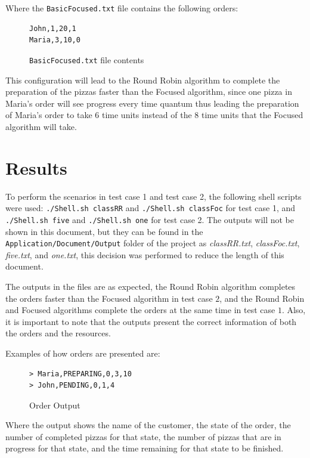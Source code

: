 \documentclass[conference]{IEEEtran}
\begin{document}
Where the \texttt{BasicFocused.txt} file contains the following orders:
\begin{figure}[H]
    \centering
    \begin{lstlisting}[style=input, frame=single]
John,1,20,1
Maria,3,10,0
    \end{lstlisting}
    \caption{\centering \texttt{BasicFocused.txt} file contents}
    \label{fig:orders1}
\end{figure}

This configuration will lead to the Round Robin algorithm to complete the preparation of the pizzas faster than the Focused algorithm, since one pizza in Maria's order will see progress every time quantum thus leading the preparation of Maria's order to take $6$ time units instead of the $8$ time units that the Focused algorithm will take.
\section{Results}
To perform the scenarios in test case 1 and test case 2, the following shell scripts were used: \texttt{./Shell.sh classRR} and \texttt{./Shell.sh classFoc} for test case 1, and \texttt{./Shell.sh five} and \texttt{./Shell.sh one} for test case 2. The outputs will not be shown in this document, but they can be found in the \texttt{Application/Document/Output} folder of the project as \textit{classRR.txt}, \textit{classFoc.txt}, \textit{five.txt}, and \textit{one.txt}, this decision was performed to reduce the length of this document. 

The outputs in the files are as expected, the Round Robin algorithm completes the orders faster than the Focused algorithm in test case $2$, and the Round Robin and Focused algorithms complete the orders at the same time in test case $1$. Also, it is important to note that the outputs present the correct information of both the orders and the resources.

Examples of how orders are presented are: 
\begin{figure}[H]
    \centering
    \begin{lstlisting}[style=input, frame=single]
> Maria,PREPARING,0,3,10
> John,PENDING,0,1,4
    \end{lstlisting}
    \caption{\centering Order Output}
    \label{fig:order_output}
\end{figure}

Where the output shows the name of the customer, the state of the order, the number of completed pizzas for that state, the number of pizzas that are in progress for that state, and the time remaining for that state to be finished.
\end{document}
